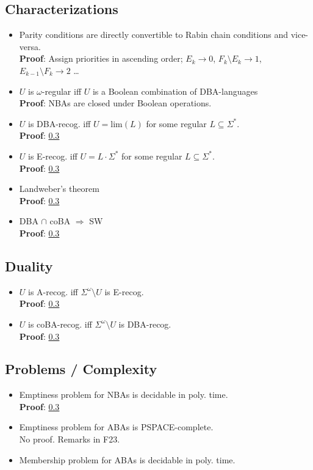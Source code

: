 \documentclass{article}
\begin{document}
\subsection{Characterizations}
\begin{itemize}
	\item Parity conditions are directly convertible to Rabin chain conditions and vice-versa. \\
		\textbf{Proof}: Assign priorities in ascending order; $E_k \rightarrow 0$, $F_k \setminus E_k \rightarrow 1$, $E_{k-1} \setminus F_k \rightarrow 2$ \dots
	\item $U$ is $\omega$-regular iff $U$ is a Boolean combination of DBA-languages \\
		\textbf{Proof}: NBAs are closed under Boolean operations. %
	\item $U$ is DBA-recog. iff $U = \text{lim}(L)$ for some regular $L \subseteq \Sigma^*$. \\
		\textbf{Proof}: \ref{} %
	\item $U$ is E-recog. iff $U = L \cdot \Sigma^*$ for some regular $L \subseteq \Sigma^*$. \\
		\textbf{Proof}: \ref{} %
	\item Landweber's theorem \\
		\textbf{Proof}: \ref{} %
	\item DBA $\cap$ coBA $\Rightarrow$ SW \\
		\textbf{Proof}: \ref{} %
\end{itemize}

\subsection{Duality}
\begin{itemize}
	\item $U$ is A-recog. iff $\Sigma^\omega \setminus U$ is E-recog. \\
		\textbf{Proof}: \ref{} %
	\item $U$ is coBA-recog. iff $\Sigma^\omega \setminus U$ is DBA-recog. \\
		\textbf{Proof}: \ref{} %
\end{itemize}

\subsection{Problems / Complexity}
\begin{itemize}
	\item Emptiness problem for NBAs is decidable in poly. time. \\
    	\textbf{Proof}: \ref{} %
    \item Emptiness problem for ABAs is PSPACE-complete. \\
    	No proof. Remarks in F23.
    \item Membership problem for ABAs is decidable in poly. time. \\
\end{itemize}
\end{document}

